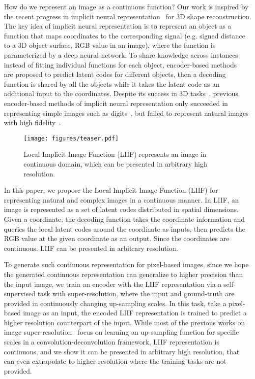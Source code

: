 \documentclass[final]{cvpr}
\begin{document}
How do we represent an image as a continuous function? Our work is inspired by the recent progress in implicit neural representation~\cite{park2019deepsdf,mescheder2019occupancy,chen2019learning,saito2019pifu,jiang2020local,sitzmann2020implicit} for 3D shape reconstruction. The key idea of implicit neural representation is to represent an object as a function that maps coordinates to the corresponding signal (e.g. signed distance to a 3D object surface, RGB value in an image), where the function is parameterized by a deep neural network. To share knowledge across instances instead of fitting individual functions for each object, encoder-based methods~\cite{mescheder2019occupancy,chen2019learning,sitzmann2020implicit} are proposed to predict latent codes for different objects, then a decoding function is shared by all the objects while it takes the latent code as an additional input to the coordinates. Despite its success in 3D tasks~\cite{saito2019pifu,saito2020pifuhd}, previous encoder-based methods of implicit neural representation only succeeded in representing simple images such as digits~\cite{chen2019learning}, but failed to represent natural images with high fidelity~\cite{sitzmann2020implicit}.

\begin{figure}
    \centering
    \texttt{[image: figures/teaser.pdf]}
    \caption{Local Implicit Image Function (LIIF) represents an image in continuous domain, which can be presented in arbitrary high resolution.}
\label{fig:teaser}
\end{figure}

In this paper, we propose the Local Implicit Image Function (LIIF) for representing natural and complex images in a continuous manner. In LIIF, an image is represented as a set of latent codes distributed in spatial dimensions. Given a coordinate, the decoding function takes the coordinate information and queries the local latent codes around the coordinate as inputs, then predicts the RGB value at the given coordinate as an output. Since the coordinates are continuous, LIIF can be presented in arbitrary resolution.

To generate such continuous representation for pixel-based images, since we hope the generated continuous representation can generalize to higher precision than the input image, we train an encoder with the LIIF representation via a self-supervised task with super-resolution, where the input and ground-truth are provided in continuously changing up-sampling scales. In this task, take a pixel-based image as an input, the encoded LIIF representation is trained to predict a higher resolution counterpart of the input. While most of the previous works on image super-resolution~\cite{dong2015image,ledig2017photo,lim2017enhanced,lai2017deep} focus on learning an up-sampling function for specific scales in a convolution-deconvolution framework, LIIF representation is continuous, and we show it can be presented in arbitrary high resolution, that can even extrapolate to  higher resolution where the training tasks are not provided.
\end{document}
